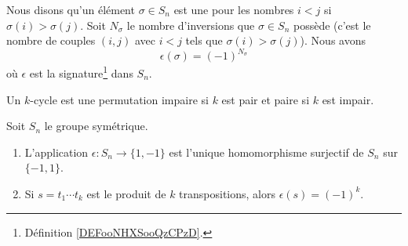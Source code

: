 \begin{lemma}  \label{LEMooWGRXooHWyzLC}
	Nous disons qu'un élément \( \sigma \in S_n\) est une  pour les nombres \( i<j\) si \( \sigma(i)>\sigma(j)\). Soit \( N_\sigma\) le nombre d'inversions que \( \sigma\in S_n\) possède (c'est le nombre de couples \( (i,j)\) avec \( i<j\) tels que \( \sigma(i)>\sigma(j)\)). Nous avons
	\begin{equation}
		\epsilon(\sigma)=(-1)^{N_\sigma}
	\end{equation}
	où \( \epsilon\) est la signature\footnote{Définition \ref{DEFooNHXSooQzCPzD}.} dans \( S_n\).
\end{lemma}

\begin{lemma}       \label{LemhxnkMf}
	Un \( k\)-cycle est une permutation impaire si \( k\) est pair et paire si \( k\) est impair.
\end{lemma}

\begin{proposition}  \label{ProphIuJrC}
	Soit \( S_n\) le groupe symétrique.
	\begin{enumerate}
		\item       \label{ITEMooBQKUooFTkvSu}
		      L'application \( \epsilon\colon S_n\to \{ 1,-1 \}\) est l'unique homomorphisme surjectif de \( S_n\) sur \( \{ -1,1 \}\).
		\item
		      Si \( s=t_1\cdots t_k\) est le produit de \( k\) transpositions, alors \( \epsilon(s)=(-1)^k\).
	\end{enumerate}
\end{proposition}

